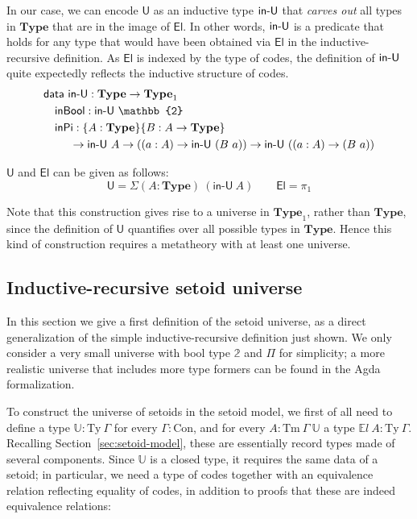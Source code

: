 \documentclass{easychair}
\newcommand{\GG}{\Gamma}
\newcommand{\ad}[1]{\AgdaFunction{#1}}
\newcommand{\mType}{\mathbf{Type}}
\newcommand{\Con}{\mathrm{Con}}
\newcommand{\Ty}{\mathrm{Ty}}
\newcommand{\Tm}{\mathrm{Tm}}
\newcommand{\U}{\textsf{U}}
\newcommand{\El}{\textsf{El}}
\newcommand{\Uty}{\mathds{U}}
\providecommand\mathbbm{\mathbb}
\begin{document}
In our case, we can encode $\U$ as an inductive type $\ad{in-U}$ that
\emph{carves out} all types in $\mType$ that are in the image of $\El$. In other
words, $\ad{in-U}$ is a predicate that holds for any type that would have been
obtained via $\El$ in the inductive-recursive definition. As $\El$ is indexed by
the type of codes, the definition of $\ad{in-U}$ quite expectedly reflects the
inductive structure of codes.
%
\begin{align*}
  & \textsf{data}\ \ad{in-U} : \mType \to \mType_1 \\
  & \quad \textsf{inBool} : \textsf{in-U}\ \mathbbm{2} \\
  & \quad \textsf{inPi}
  :  \{A : \mType\} \{B : A \to \mType\}\\
  & \ \qquad \to \ad{in-U}\ A
  \to ((a : A) \to \ad{in-U}\ (B\ a))
  \to \ad{in-U}\ ((a : A) \to (B\ a))
\end{align*}

$\U$ and $\El$ can be given as follows:
\[
\U = \Sigma (A : \mType)\ (\textsf{in-U}\ A) \qquad \El = \pi_1
\]

Note that this construction gives rise to a universe in $\mType_1$, rather than
$\mType$, since the definition of $\U$ quantifies over all possible types in
$\mType$. Hence this kind of construction requires a metatheory with at least
one universe.

\subsection{Inductive-recursive setoid universe}\label{ir-setoid-universe}

In this section we give a first definition of the setoid universe, as a direct
generalization of the simple inductive-recursive definition just shown. We only
consider a very small universe with bool type $\mathbbm{2}$ and $\Pi$ for
simplicity; a more realistic universe that includes more type formers
can be found in the Agda formalization.

To construct the universe of setoids in the setoid model, we first of all need
to define a type $\Uty : \Ty\ \GG$ for every $\GG : \Con$, and for every $A :
\Tm\ \GG\ \Uty$ a type $\mathds{E}l\ A : \Ty\ \GG$. Recalling
Section~\ref{sec:setoid-model}, these are essentially record types made of several
components. Since $\Uty$ is a closed type, it requires the same data of a
setoid; in particular, we need a type of codes together with an equivalence
relation reflecting equality of codes, in addition to proofs that these are
indeed equivalence relations:
%
\end{document}
